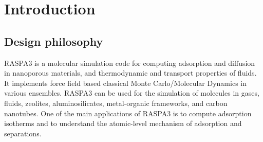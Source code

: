 \chapter{Introduction}


\section{Design philosophy}

RASPA3 is a molecular simulation code for computing adsorption and diffusion in nanoporous materials, 
and thermodynamic and transport properties of fluids. 
It implements force field based classical Monte Carlo/Molecular Dynamics in various ensembles.
RASPA3 can be used for the simulation of molecules in gases, fluids, zeolites, aluminosilicates,
metal-organic frameworks, and carbon nanotubes.
One of the main applications of RASPA3 is to compute adsorption isotherms and to 
understand the atomic-level mechanism of adsorption and separations.


